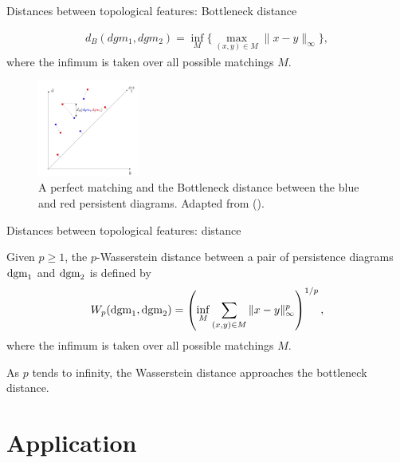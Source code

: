 \documentclass[xcolor={dvipsnames,svgnames}]{beamer}
\begin{document}
\begin{frame}{Distances between topological features: Bottleneck distance}
    \begin{defn}
\begin{align}
    d_B(dgm_1, dgm_2) = \inf_M\{\max_{(x,y)\in M} \|x-y\|_\infty\},
\end{align}
where the infimum is taken over all possible matchings $M$.
\end{defn}
   \begin{figure}[H]
   \label{matching}
        \centering \includegraphics[width=0.3\textwidth]{figures/matching.png}
            \caption{A perfect matching and the Bottleneck distance between the blue and red persistent diagrams. Adapted from (\cite{chazal_introduction_2021}).} \label{fig:perfect-matching}
    \end{figure}
\end{frame}

\begin{frame}{Distances between topological features: distance}
    
\begin{defn}
Given $p\geq 1$, the $p$-Wasserstein distance between a pair of persistence diagrams $\text{dgm}_1$ and $\text{dgm}_2$ is defined by 
\begin{align}
    W_p(\text{dgm}_1, \text{dgm}_2) = \left(\inf_M \sum_{(x,y)\in M}\|x-y\|^p_\infty\right)^{1/p},
\end{align}
where the infimum is taken over all possible matchings $M$.
\end{defn}
As $p$ tends to infinity, the Wasserstein distance approaches the bottleneck distance.
\end{frame}
\section{Application}
\end{document}
